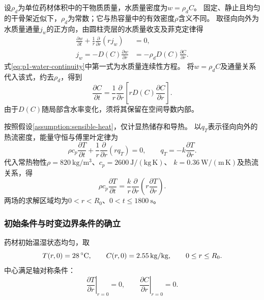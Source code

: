 设$\rho_d$为单位药材体积中的干物质质量，水质量密度为$w=\rho_d C$。
固定、静止且均匀的干骨架近似下，$\rho_d$为常数；它与热容量中的有效密度$\rho$含义不同。
取径向向外为水质量通量$j_w$的正方向，由圆柱壳层的水质量收支及菲克定律\cite{fick}得
\begin{equation}
\begin{aligned}
  \frac{\partial w}{\partial t}
    +\frac{1}{r}\frac{\partial}{\partial r}(rj_w)&=0,\\
  j_w=-D(C)\frac{\partial w}{\partial r}
    &=-\rho_dD(C)\frac{\partial C}{\partial r}.
\end{aligned}
  \label{eq:p1-water-continuity}
\end{equation}
式\eqref{eq:p1-water-continuity}中第一式为水质量连续性方程。
将$w=\rho_d C$及通量关系代入该式，约去$\rho_d$，得到
\begin{equation}
  \boxed{\frac{\partial C}{\partial t}
  =\frac{1}{r}\frac{\partial}{\partial r}
    \left[rD(C)\frac{\partial C}{\partial r}\right].}
  \label{eq:p1-mass}
\end{equation}
由于$D(C)$随局部含水率变化，须将其保留在空间导数内部。

按照假设\ref{assumption:sensible-heat}，仅计显热储存和导热。
以$q_T$表示径向向外的热流密度，能量守恒与傅里叶定律为\cite{heat}
\begin{equation}
  \rho c_p\frac{\partial T}{\partial t}
  +\frac{1}{r}\frac{\partial}{\partial r}(rq_T)=0,\qquad
  q_T=-k\frac{\partial T}{\partial r}.
  \label{eq:p1-energy-fourier}
\end{equation}
代入常热物性$\rho=820\ \mathrm{kg/m^3}$、$c_p=2600\ \mathrm{J/(kg\,K)}$、
$k=0.36\ \mathrm{W/(m\,K)}$及热流关系，得
\begin{equation}
  \boxed{\rho c_p\frac{\partial T}{\partial t}
  =\frac{k}{r}\frac{\partial}{\partial r}
    \left(r\frac{\partial T}{\partial r}\right).}
  \label{eq:p1-heat}
\end{equation}
两场的求解区域均为$0<r<R_0$、$0<t\le1800\ \mathrm{s}$。

\subsubsection{初始条件与时变边界条件的确立}

药材初始温湿状态均匀，取
\begin{equation}
  T(r,0)=28\,{}^{\circ}\mathrm{C},\qquad
  C(r,0)=2.55\,\mathrm{kg/kg},\qquad 0\le r\le R_0.
  \label{eq:p1-initial}
\end{equation}
中心满足轴对称条件：
\begin{equation}
  \left.\frac{\partial T}{\partial r}\right|_{r=0}=0,\qquad
  \left.\frac{\partial C}{\partial r}\right|_{r=0}=0.
  \label{eq:p1-center}
\end{equation}


